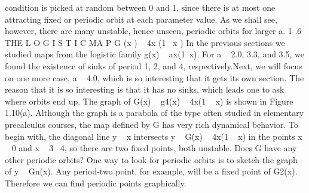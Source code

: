 \documentclass{article}
\begin{document}
condition is picked at random between 0 and 1, since there is at most one
attracting fixed or periodic orbit at each parameter value. As we shall see, however,
there are many unstable, hence unseen, periodic orbits for larger a.
1 .6 THE L O G I S T I C MA P G (x )   4x (1  x )
In the previous sections we studied maps from the logistic family g(x)   ax(1 x).
For a   2.0, 3.3, and 3.5, we found the existence of sinks of period 1, 2, and 4,
respectively.Next, we will focus on one more case, a   4.0, which is so interesting
that it gets its own section. The reason that it is so interesting is that it has no
sinks, which leads one to ask where orbits end up.
The graph of G(x)   g4(x)   4x(1   x) is shown in Figure 1.10(a). Although
the graph is a parabola of the type often studied in elementary precalculus
courses, the map defined by G has very rich dynamical behavior. To begin with,
the diagonal line y   x intersects y   G(x)   4x(1   x) in the points x   0 and
x   3  4, so there are two fixed points, both unstable. Does G have any other
periodic orbits?
One way to look for periodic orbits is to sketch the graph of y   Gn(x).
Any period-two point, for example, will be a fixed point of G2(x). Therefore we
can find periodic points graphically.
\end{document}
